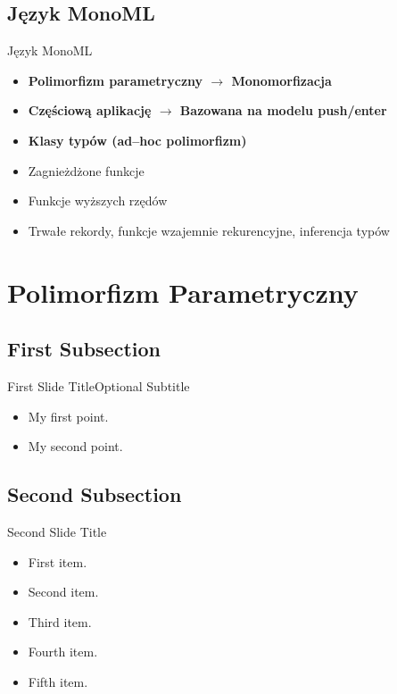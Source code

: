 \documentclass{beamer}
\begin{document}
\subsection{Język MonoML}

\begin{frame}{Język MonoML}
\begin{itemize}
    \pause
    \item \textbf{Polimorfizm parametryczny $\rightarrow$ Monomorfizacja}
    \pause
    \item \textbf{Częściową aplikację $\rightarrow$ Bazowana na modelu
    push/enter}
    \pause
    \item \textbf{Klasy typów (ad--hoc polimorfizm)}
    \pause 
    \item Zagnieżdżone funkcje 
    \item Funkcje wyższych rzędów 
    \item Trwałe rekordy, funkcje wzajemnie rekurencyjne, inferencja typów
\end{itemize}
\end{frame}

\section{Polimorfizm Parametryczny}

\subsection{First Subsection}

\begin{frame}{First Slide Title}{Optional Subtitle}
  \begin{itemize}
  \item {
    My first point.
  }
  \item {
    My second point.
  }
  \end{itemize}
\end{frame}

\subsection{Second Subsection}

\begin{frame}{Second Slide Title}
  \begin{itemize}
  \item {
    First item.
    \pause %
  }
  \item {   
    Second item.
  }
  \item<3-> {
    Third item.
  }
  \item<4-> {
    Fourth item.
  }
  \item<5-> {
    Fifth item. 
  }
  \end{itemize}
\end{frame}
\end{document}
